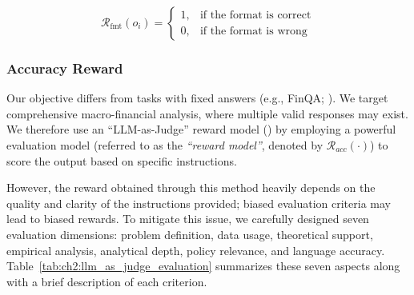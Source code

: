 \begin{equation}\label{eq:ch2:format_reward}
    \mathcal{R}_{\text{fmt}}(o_i) = 
    \begin{cases}
        1, & \text{if the format is correct} \\
        0, & \text{if the format is wrong}
    \end{cases}
\end{equation}




\subsubsection*{Accuracy Reward}

Our objective differs from tasks with fixed answers (e.g., FinQA; \cite{chen2021finqa}). We target comprehensive macro-financial analysis, where multiple valid responses may exist. We therefore use an ``LLM-as-Judge'' reward model (\cite{zheng2023judging}) by employing a powerful evaluation model (referred to as the \textit{``reward model''}, denoted by $\mathcal{R}_{acc}(\cdot)$) to score the output based on specific instructions.

However, the reward obtained through this method heavily depends on the quality and clarity of the instructions provided; biased evaluation criteria may lead to biased rewards. To mitigate this issue, we carefully designed seven evaluation dimensions: problem definition, data usage, theoretical support, empirical analysis, analytical depth, policy relevance, and language accuracy. Table~\ref{tab:ch2:llm_as_judge_evaluation} summarizes these seven aspects along with a brief description of each criterion.



